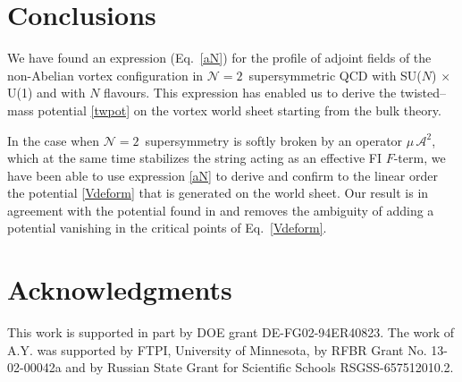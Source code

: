 \documentclass[12pt]{article}
\newcommand{\ntwon}{${\mathcal N}=2$}
\newcommand{\ma}{\mathcal{A}}
\newcommand{\sunu}{{\rm SU($N$) $\times$ U(1) }}
\begin{document}
\section{Conclusions}

	We have found an expression (Eq.~\eqref{aN}) for the profile of adjoint fields 
	of the non-Abelian vortex configuration in \ntwon\, supersymmetric QCD 
	with \sunu and with $ N $ flavours.
	This expression has enabled us to derive the twisted--mass potential \eqref{twpot} on the 
	vortex world sheet starting from the bulk theory.

	In the case when \ntwon\, supersymmetry is softly broken by an operator $ \mu\, \ma^2 $, 
	which at the same time stabilizes the string acting as an effective FI $ F $-term,
	we have been able to use expression \eqref{aN} to derive and confirm to the linear order
	the potential \eqref{Vdeform} that is generated on the world sheet.
	Our result is in agreement with the potential found in \cite{Shifman:2010kr}
	and removes the ambiguity of adding a potential vanishing in the critical points of Eq.~\eqref{Vdeform}.




\section*{Acknowledgments}

	This work  is supported in part by DOE grant DE-FG02-94ER40823. 
	The work of A.Y. was  supported 
	by  FTPI, University of Minnesota, 
	by RFBR Grant No. 13-02-00042a 
	and by Russian State Grant for 
	Scientific Schools RSGSS-657512010.2.
\end{document}
